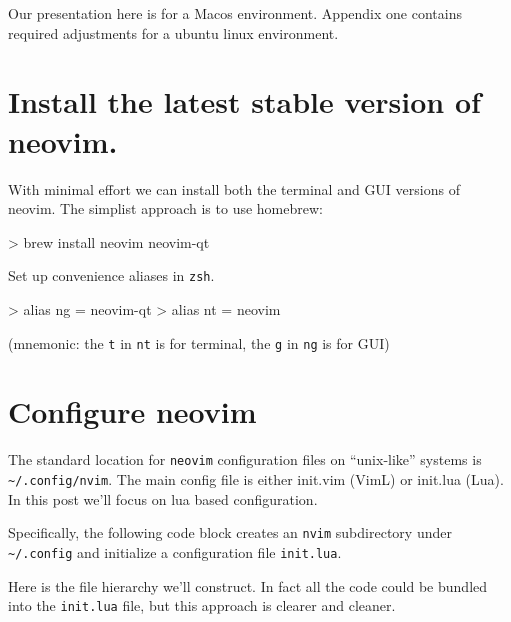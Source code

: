 \documentclass[
  letterpaper,
  DIV=11,
  numbers=noendperiod,
  oneside]{scrartcl}
\newenvironment{Shaded}{\begin{snugshade}}{\end{snugshade}}
\newcommand{\ExtensionTok}[1]{\textcolor[rgb]{0.00,0.23,0.31}{#1}}
\newcommand{\FunctionTok}[1]{\textcolor[rgb]{0.28,0.35,0.67}{#1}}
\newcommand{\NormalTok}[1]{\textcolor[rgb]{0.00,0.23,0.31}{#1}}
\newcommand{\OperatorTok}[1]{\textcolor[rgb]{0.37,0.37,0.37}{#1}}
\begin{document}
Our presentation here is for a Macos environment. Appendix one contains
required adjustments for a ubuntu linux environment.

\section{Install the latest stable version of
neovim.}\label{install-the-latest-stable-version-of-neovim.}

With minimal effort we can install both the terminal and GUI versions of
neovim. The simplist approach is to use homebrew:

\begin{Shaded}
\begin{Highlighting}[]
\OperatorTok{\textgreater{}}\NormalTok{ brew }\FunctionTok{install}\NormalTok{ neovim neovim{-}qt}
\end{Highlighting}
\end{Shaded}

Set up convenience aliases in \texttt{zsh}.

\begin{Shaded}
\begin{Highlighting}[]
\OperatorTok{\textgreater{}}\NormalTok{ alias }\ExtensionTok{ng}\NormalTok{ = neovim{-}qt}
\OperatorTok{\textgreater{}}\NormalTok{ alias }\ExtensionTok{nt}\NormalTok{ = neovim}
\end{Highlighting}
\end{Shaded}

(mnemonic: the \texttt{t} in \texttt{nt} is for terminal, the \texttt{g}
in \texttt{ng} is for GUI)

\section{Configure neovim}\label{configure-neovim}

The standard location for \texttt{neovim} configuration files on
``unix-like'' systems is \texttt{\textasciitilde{}/.config/nvim}. The
main config file is either init.vim (VimL) or init.lua (Lua). In this
post we'll focus on lua based configuration.

Specifically, the following code block creates an \texttt{nvim}
subdirectory under \texttt{\textasciitilde{}/.config} and initialize a
configuration file \texttt{init.lua}.

Here is the file hierarchy we'll construct. In fact all the code could
be bundled into the \texttt{init.lua} file, but this approach is clearer
and cleaner.
\end{document}
